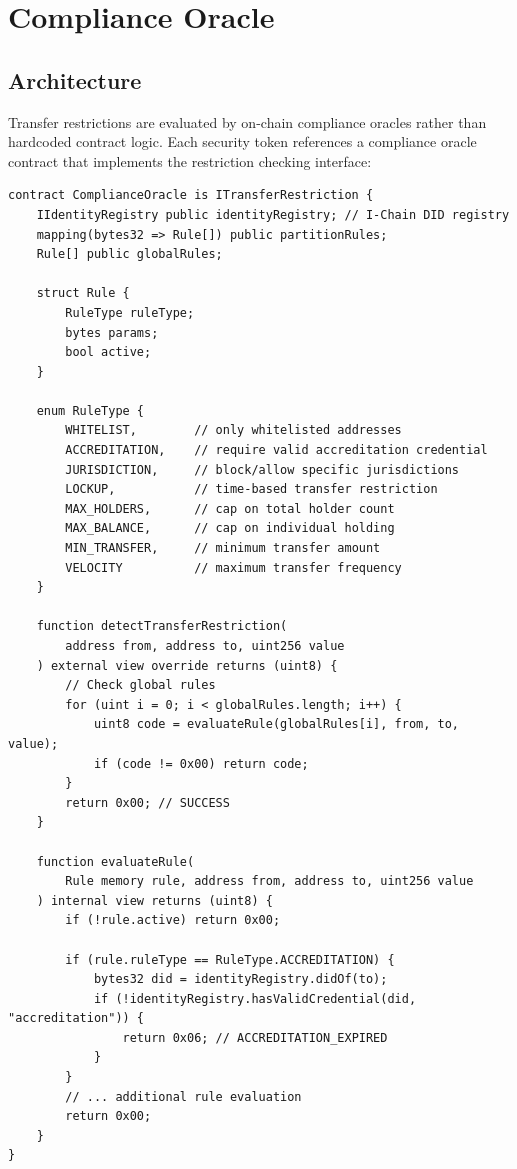 \section{Compliance Oracle}
\label{sec:compliance}

\subsection{Architecture}

Transfer restrictions are evaluated by on-chain compliance oracles rather than hardcoded contract logic. Each security token references a compliance oracle contract that implements the restriction checking interface:

\begin{lstlisting}[language=Solidity,caption={Compliance oracle.}]
contract ComplianceOracle is ITransferRestriction {
    IIdentityRegistry public identityRegistry; // I-Chain DID registry
    mapping(bytes32 => Rule[]) public partitionRules;
    Rule[] public globalRules;

    struct Rule {
        RuleType ruleType;
        bytes params;
        bool active;
    }

    enum RuleType {
        WHITELIST,        // only whitelisted addresses
        ACCREDITATION,    // require valid accreditation credential
        JURISDICTION,     // block/allow specific jurisdictions
        LOCKUP,           // time-based transfer restriction
        MAX_HOLDERS,      // cap on total holder count
        MAX_BALANCE,      // cap on individual holding
        MIN_TRANSFER,     // minimum transfer amount
        VELOCITY          // maximum transfer frequency
    }

    function detectTransferRestriction(
        address from, address to, uint256 value
    ) external view override returns (uint8) {
        // Check global rules
        for (uint i = 0; i < globalRules.length; i++) {
            uint8 code = evaluateRule(globalRules[i], from, to, value);
            if (code != 0x00) return code;
        }
        return 0x00; // SUCCESS
    }

    function evaluateRule(
        Rule memory rule, address from, address to, uint256 value
    ) internal view returns (uint8) {
        if (!rule.active) return 0x00;

        if (rule.ruleType == RuleType.ACCREDITATION) {
            bytes32 did = identityRegistry.didOf(to);
            if (!identityRegistry.hasValidCredential(did, "accreditation")) {
                return 0x06; // ACCREDITATION_EXPIRED
            }
        }
        // ... additional rule evaluation
        return 0x00;
    }
}
\end{lstlisting}

